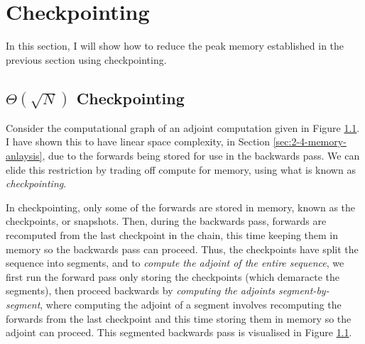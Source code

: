 \section{Checkpointing} \label{sec:2-5-bg-checkpointing}
In this section, I will show how to reduce the peak memory established in the previous section using checkpointing.


\subsection{\texorpdfstring{\(\Theta(\sqrt{N})\)}{\textit{O(sqrt(N))}} Checkpointing}
Consider the computational graph of an adjoint computation given in Figure \ref{}.
I have shown this to have linear space complexity, in Section \ref{sec:2-4-memory-anlaysis}, due to the forwards being stored for use in the backwards pass.
We can elide this restriction by trading off compute for memory, using what is known as \textit{checkpointing}.

In checkpointing, only some of the forwards are stored in memory, known as the checkpoints, or snapshots.
Then, during the backwards pass, forwards are recomputed from the last checkpoint in the chain, this time keeping them in memory so the backwards pass can proceed.
Thus, the checkpoints have split the sequence into segments, and
to \textit{compute the adjoint of the entire sequence}, we first run the forward pass only storing the checkpoints (which demaracte the segments),
then proceed backwards by \textit{computing the adjoints segment-by-segment},
where computing the adjoint of a segment involves recomputing the forwards from the last checkpoint and this time storing them in memory so the adjoint can proceed.
This segmented backwards pass is visualised in Figure \ref{}.

